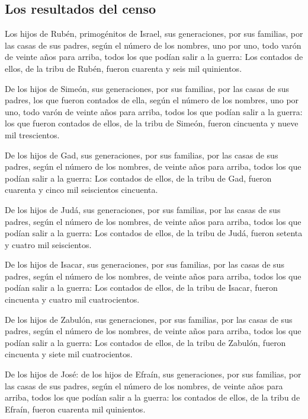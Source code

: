 \hypertarget{los-resultados-del-censo}{%
\subsection{Los resultados del censo}\label{los-resultados-del-censo}}

 Los hijos de Rubén, primogénitos de Israel, sus
generaciones, por sus familias, por las casas de sus padres, según el
número de los nombres, uno por uno, todo varón de veinte años para
arriba, todos los que podían salir a la guerra:  Los
contados de ellos, de la tribu de Rubén, fueron cuarenta y seis mil
quinientos.

 De los hijos de Simeón, sus generaciones, por sus
familias, por las casas de sus padres, los que fueron contados de ella,
según el número de los nombres, uno por uno, todo varón de veinte años
para arriba, todos los que podían salir a la guerra:  los
que fueron contados de ellos, de la tribu de Simeón, fueron cincuenta y
nueve mil trescientos.

 De los hijos de Gad, sus generaciones, por sus familias,
por las casas de sus padres, según el número de los nombres, de veinte
años para arriba, todos los que podían salir a la guerra:
 Los contados de ellos, de la tribu de Gad, fueron
cuarenta y cinco mil seiscientos cincuenta.

 De los hijos de Judá, sus generaciones, por sus
familias, por las casas de sus padres, según el número de los nombres,
de veinte años para arriba, todos los que podían salir a la guerra:
 Los contados de ellos, de la tribu de Judá, fueron
setenta y cuatro mil seiscientos.

 De los hijos de Isacar, sus generaciones, por sus
familias, por las casas de sus padres, según el número de los nombres,
de veinte años para arriba, todos los que podían salir a la guerra:
 Los contados de ellos, de la tribu de Isacar, fueron
cincuenta y cuatro mil cuatrocientos.

 De los hijos de Zabulón, sus generaciones, por sus
familias, por las casas de sus padres, según el número de los nombres,
de veinte años para arriba, todos los que podían salir a la guerra:
 Los contados de ellos, de la tribu de Zabulón, fueron
cincuenta y siete mil cuatrocientos.

 De los hijos de José: de los hijos de Efraín, sus
generaciones, por sus familias, por las casas de sus padres, según el
número de los nombres, de veinte años para arriba, todos los que podían
salir a la guerra:  los contados de ellos, de la tribu de
Efraín, fueron cuarenta mil quinientos.

